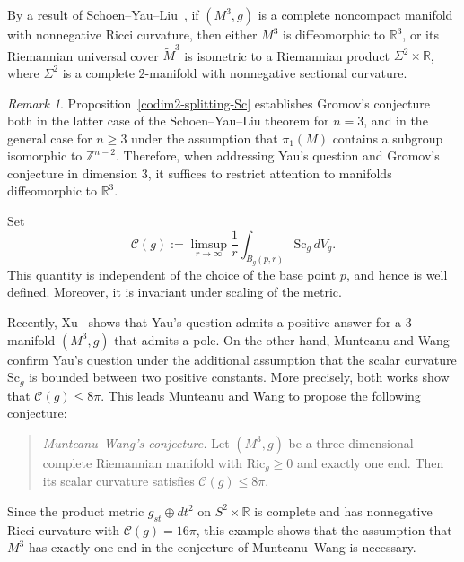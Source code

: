 \documentclass[12pt,oneside,a4paper]{article}
\theoremstyle{mytheorem}
\theoremstyle{remark}
\newtheorem{remark}[definition]{Remark}
\begin{document}
By a result of Schoen--Yau--Liu~\cite{zbMATH06210494}, if $(M^3,g)$ is a complete noncompact manifold with nonnegative Ricci curvature, then either $M^3$ is diffeomorphic to $\mathbb{R}^3$, or its Riemannian universal cover $\widetilde{M}^3$ is isometric to a Riemannian product $\Sigma^2 \times \mathbb{R}$, where $\Sigma^2$ is a complete $2$-manifold with nonnegative sectional curvature.

\begin{remark}

Proposition~\ref{codim2-splitting-Sc} establishes Gromov's conjecture both in the latter case of the Schoen--Yau--Liu theorem for $n=3$, and  in the general case for $n\geq 3$ under the assumption that $\pi_1(M)$ contains a subgroup isomorphic to $\mathbb{Z}^{n-2}$. Therefore, when addressing Yau's question and Gromov's conjecture in dimension $3$, it suffices to restrict attention to manifolds diffeomorphic to $\mathbb{R}^3$.
\end{remark}

Set
\[
\mathcal{C}(g):=\limsup_{r \to \infty} \frac{1}{r} \int_{B_g(p,r)} \mathrm{Sc}_g \, dV_g .
\]
This quantity is independent of the choice of the base point \(p\), and hence is well defined. Moreover, it is invariant under scaling of the metric.

Recently,  Xu~\cite{MR4802637} shows that Yau's question admits a positive answer for a $3$-manifold $(M^3,g)$ that admits a pole. On the other hand, Munteanu and Wang~\cite{2025arXiv250510520M} confirm Yau's question under the additional assumption that the scalar curvature $\mathrm{Sc}_g$ is bounded between two positive constants. More precisely, both works show that $\mathcal{C}(g) \le 8\pi.$ 
This leads Munteanu and Wang \cite[Conjecture~1.3]{2025arXiv250510520M} to propose the following conjecture: 

\begin{quote}
\textit{Munteanu--Wang’s conjecture.} 
Let $(M^3,g)$ be a three-dimensional complete Riemannian manifold with $\mathrm{Ric}_g \ge 0$ and exactly one end. Then its scalar curvature satisfies $\mathcal{C}(g)\le 8\pi$.
\end{quote}


Since the product metric \(g_{st} \oplus dt^{2}\) on \(S^{2}\times \mathbb{R}\) is complete and has nonnegative Ricci curvature with \(\mathcal{C}(g)=16\pi\), this example shows that the assumption that \(M^3\) has exactly one end in the conjecture of Munteanu--Wang is necessary.

 
\end{document}
